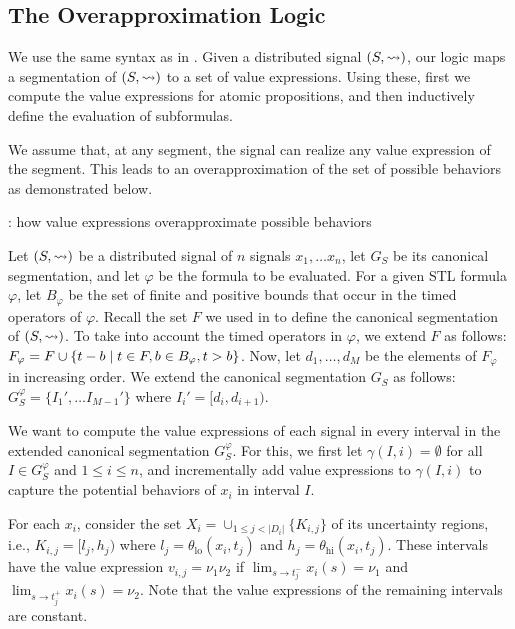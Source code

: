 \subsection{The Overapproximation Logic}
We use the same syntax as in .
Given a distributed signal $(S,{\rightsquigarrow})$, our logic maps a segmentation of $(S,{\rightsquigarrow})$ to a set of value expressions.
Using these, first we compute the value expressions for atomic propositions, and then inductively define the evaluation of subformulas.

We assume that, at any segment, the signal can realize any value expression of the segment.
This leads to an overapproximation of the set of possible behaviors as demonstrated below.

\begin{example}
	\TODO: how value expressions overapproximate possible behaviors
\end{example}

Let $(S,{\rightsquigarrow})$ be a distributed signal of $n$ signals $x_1, \ldots x_n$, let $G_S$ be its canonical segmentation, and let $\varphi$ be the formula to be evaluated.
For a given STL formula $\varphi$, let $B_\varphi$ be the set of finite and positive bounds that occur in the timed operators of $\varphi$.
Recall the set $F$ we used in  to define the canonical segmentation of $(S,{\rightsquigarrow})$.
To take into account the timed operators in $\varphi$, we extend $F$ as follows:
$F_\varphi = F \cup \{t - b \st t \in F, b \in B_\varphi, t > b\}$.
Now, let $d_1, \ldots, d_M$ be the elements of $F_\varphi$ in increasing order.
We extend the canonical segmentation $G_S$ as follows:
$G_S^\varphi = \{I_1', \ldots I_{M-1}'\}$ where $I_i' = [d_i, d_{i+1})$.

We want to compute the value expressions of each signal in every interval in the extended canonical segmentation $G_S^\varphi$.
For this, we first let $\gamma(I, i) = \emptyset$ for all $I \in G_S^\varphi$ and $1 \leq i \leq n$, and incrementally add value expressions to $\gamma(I, i)$ to capture the potential behaviors of $x_i$ in interval $I$.

For each $x_i$, consider the set $X_i = \cup_{1 \leq j < |D_i|} \{K_{i,j}\}$ of its uncertainty regions, i.e.,  $K_{i,j} = [l_j, h_j)$ where $l_j = \theta_{\text{lo}}(x_i, t_j)$ and $h_j = \theta_{\text{hi}}(x_i, t_j)$.
These intervals have the value expression $v_{i,j} = \nu_1 \nu_2$ if $\lim_{s \to t_j^-} x_i(s) = \nu_1$ and $\lim_{s \to t_j^+} x_i(s) = \nu_2$.
Note that the value expressions of the remaining intervals are constant.

